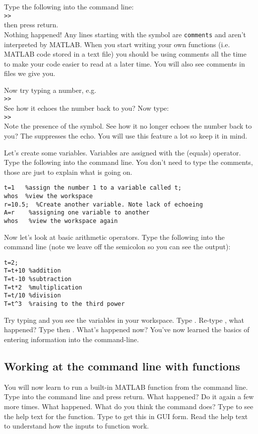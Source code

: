\documentclass{article}
\begin{document}
Type the following into the command line: \\
\verb|>>|  \\
then press return. \\
Nothing happened! Any lines starting with the \mcode{\%} symbol are \verb|comments| and aren't interpreted by MATLAB. When you start writing
your own functions (i.e. MATLAB code stored in a text file) you should be using comments all the time to make your code easier to read at a later time. 
You will also see comments in files we give you. 

Now try typing a number, e.g. \\
\verb|>>|  \\
See how it echoes the number back to you? Now type: \\
\verb|>>|  \\ 
Note the presence of the \mcode{;} symbol. See how it no longer echoes the number back to you? The \mcode{;} suppresses the echo. You will use this feature a lot so keep it in mind. 

Let's create some variables. Variables are assigned with the \mcode{=} (equals) operator. Type the following into the command line. You don't need to type the 
comments, those are just to explain what is going on. 


\begin{lstlisting}
t=1   %assign the number 1 to a variable called t;
whos  %view the workspace
r=10.5;  %Create another variable. Note lack of echoeing
A=r    %assigning one variable to another
whos   %view the workspace again
\end{lstlisting}

Now let's look at basic arithmetic operators. Type the following into the command line (note we leave off the semicolon so you can see the output):
\begin{lstlisting}
t=2;
T=t+10 %addition
T=t-10 %subtraction
T=t*2  %multiplication
T=t/10 %division
T=t^3  %raising to the third power
\end{lstlisting}


Try typing  and you see the variables in your workspace. Type . Re-type , what happened? Type  then . What's happened now? You've now learned the basics of entering information into the command-line. 


\subsection*{Working at the command line with functions}
You will now learn to run a built-in MATLAB function from the command line. Type  into the command line and press return. What happened? Do it again a few more times. What happened. What do you think the  command does? Type  to see the help text for the  function. Type  to get this in GUI form. Read the help text to understand how the inputs to function work. 
\end{document}
